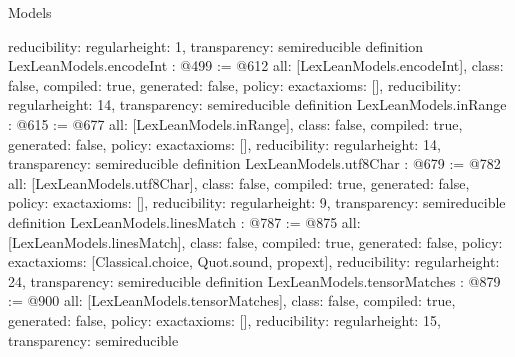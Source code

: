 \begin{lexlean}{Models}
\begin{coremodule}
{  reducibility: regular{height: 1},
  transparency: semireducible
}
definition LexLeanModels.encodeInt : @499 := @612 {
  all: [LexLeanModels.encodeInt],
  class: false,
  compiled: true,
  generated: false,
  policy: exact{axioms: []},
  reducibility: regular{height: 14},
  transparency: semireducible
}
definition LexLeanModels.inRange : @615 := @677 {
  all: [LexLeanModels.inRange],
  class: false,
  compiled: true,
  generated: false,
  policy: exact{axioms: []},
  reducibility: regular{height: 14},
  transparency: semireducible
}
definition LexLeanModels.utf8Char : @679 := @782 {
  all: [LexLeanModels.utf8Char],
  class: false,
  compiled: true,
  generated: false,
  policy: exact{axioms: []},
  reducibility: regular{height: 9},
  transparency: semireducible
}
definition LexLeanModels.linesMatch : @787 := @875 {
  all: [LexLeanModels.linesMatch],
  class: false,
  compiled: true,
  generated: false,
  policy: exact{axioms: [Classical.choice, Quot.sound, propext]},
  reducibility: regular{height: 24},
  transparency: semireducible
}
definition LexLeanModels.tensorMatches : @879 := @900 {
  all: [LexLeanModels.tensorMatches],
  class: false,
  compiled: true,
  generated: false,
  policy: exact{axioms: []},
  reducibility: regular{height: 15},
  transparency: semireducible
}


\end{coremodule}
\end{lexlean}
